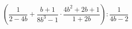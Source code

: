 \begin{ex}[type=expression]
	\begin{condition}
		\(\left( \dfrac{1}{2-4b} +\dfrac{b+1}{8b^3-1}\cdot\dfrac{4b^2+2b+1}{1+2b}\right):\dfrac{1}{4b-2}\)
	\end{condition}
\end{ex}